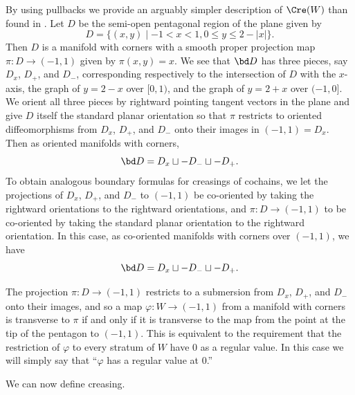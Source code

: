 By using pullbacks we provide an arguably simpler description of $\Cre(W)$ than found in \cite{Lipy14}.
Let $D$ be the semi-open pentagonal region of the plane given by
$$D = \{(x,y) \mid -1<x<1, 0 \leq y \leq 2-|x|\}.$$
Then $D$ is a manifold with corners with a smooth proper projection map $\pi \colon D \to (-1,1)$ given by $\pi(x,y) = x$.
We see that $\bd D$ has three pieces, say $D_x$, $D_+$, and $D_-$, corresponding respectively to the intersection of $D$ with the $x$-axis, the graph of $y = 2-x$ over $[0,1)$, and the graph of $y = 2+x$ over $(-1, 0]$.
We orient all three pieces by rightward pointing tangent vectors in the plane and give $D$ itself the standard planar orientation so that $\pi$ restricts to oriented diffeomorphisms from $D_x$, $D_+$, and $D_-$ onto their images in $(-1,1) = D_x$.
Then as oriented manifolds with corners, $$\bd D = D_x \sqcup -D_- \sqcup -D_+.$$
To obtain analogous boundary formulas for creasings of cochains, we let the projections of $D_x$, $D_+$, and $D_-$ to $(-1,1)$ be co-oriented by taking the rightward orientations to the rightward orientations, and $\pi \colon D \to (-1,1)$ to be co-oriented by taking the standard planar orientation to the rightward orientation.
In this case, as co-oriented manifolds with corners over $(-1,1)$, we have
$$\bd D = D_x \sqcup -D_- \sqcup -D_+.$$

The projection $\pi \colon D \to (-1,1)$ restricts to a submersion from $D_x$, $D_+$, and $D_-$ onto their images, and so a map $\varphi \colon W \to (-1,1)$ from a manifold with corners is transverse to $\pi$ if and only if it is transverse to the map from the point at the tip of the pentagon to $(-1,1)$.
This is equivalent to the requirement that the restriction of $\varphi$ to every stratum of $W$ have $0$ as a regular value.
In this case we will simply say that ``$\varphi$ has a regular value at $0$.''

We can now define creasing.

